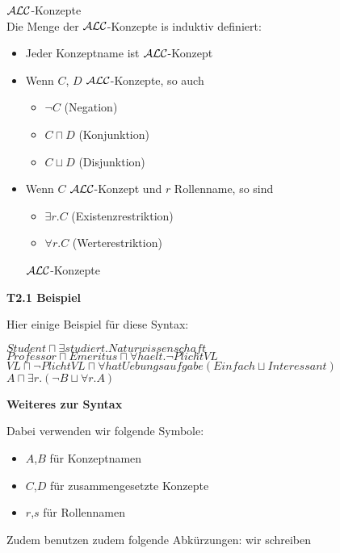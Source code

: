 \theoremstyle{definition}
\begin{definition}{$\mathcal{A}\mathcal{L}\mathcal{C}$-Konzepte} \\
	Die Menge der $\mathcal{A}\mathcal{L}\mathcal{C}$-Konzepte is induktiv definiert:
	\begin{itemize}
		\item Jeder Konzeptname ist $\mathcal{A}\mathcal{L}\mathcal{C}$-Konzept
		\item Wenn $C$, $D$ $\mathcal{A}\mathcal{L}\mathcal{C}$-Konzepte, so auch
		\begin{itemize}
			\item $\neg C$ \tabto{2cm}(Negation)
			\item $C \sqcap D$ \tabto{2cm}(Konjunktion)
			\item $C \sqcup D$ \tabto{2cm}(Disjunktion)
		\end{itemize}
		\item {Wenn $C$ $\mathcal{A}\mathcal{L}\mathcal{C}$-Konzept und $r$ Rollenname, so sind
		\begin{itemize}
			\item $\exists r.C$ \tabto{2cm}(Existenzrestriktion)
			\item $\forall r.C$ \tabto{2cm}(Werterestriktion)
		\end{itemize}
		$\mathcal{A}\mathcal{L}\mathcal{C}$-Konzepte}
	\end{itemize}
\end{definition}

\textbf{T2.1 Beispiel}

Hier einige Beispiel für diese Syntax:

\begin{center}
$Student \sqcap \exists studiert.Naturwissenschaft$ \\
$Professor \sqcap Emeritus \sqcap \forall haelt.\neg PlichtVL$ \\
$VL \sqcap \neg PlichtVL \sqcap \forall hatUebungsaufgabe(Einfach \sqcup Interessant)$ \\
$A \sqcap \exists r.(\neg B \sqcup \forall r.A)$
\end{center}

\textbf{Weiteres zur Syntax}

Dabei verwenden wir folgende Symbole:

\begin{itemize}
	\item{$A$,$B$ für Konzeptnamen}
	\item{$C$,$D$ für zusammengesetzte Konzepte}
	\item{$r$,$s$ für Rollennamen}
\end{itemize}

Zudem benutzen zudem folgende Abkürzungen: wir schreiben


